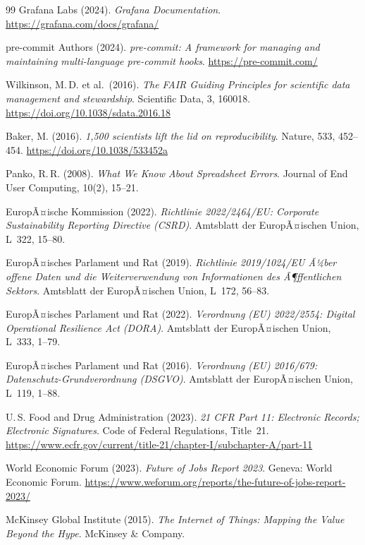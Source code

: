 ﻿\documentclass[12pt,a4paper]{report}
\theoremstyle{definition}
\theoremstyle{remark}
\begin{document}
\begin{thebibliography}{99}
  Grafana Labs (2024).
  \textit{Grafana Documentation}.
  \url{https://grafana.com/docs/grafana/}

  pre-commit Authors (2024).
  \textit{pre-commit: A framework for managing and maintaining multi-language
  pre-commit hooks}.
  \url{https://pre-commit.com/}

  Wilkinson, M.\,D. et al.\ (2016).
  \textit{The FAIR Guiding Principles for scientific data management
  and stewardship}.
  Scientific Data, 3, 160018.
  \url{https://doi.org/10.1038/sdata.2016.18}

  Baker, M. (2016).
  \textit{1,500 scientists lift the lid on reproducibility}.
  Nature, 533, 452--454.
  \url{https://doi.org/10.1038/533452a}

  Panko, R.\,R. (2008).
  \textit{What We Know About Spreadsheet Errors}.
  Journal of End User Computing, 10(2), 15--21.

  EuropÃ¤ische Kommission (2022).
  \textit{Richtlinie 2022/2464/EU: Corporate Sustainability Reporting
  Directive (CSRD)}.
  Amtsblatt der EuropÃ¤ischen Union, L~322, 15--80.

  EuropÃ¤isches Parlament und Rat (2019).
  \textit{Richtlinie 2019/1024/EU Ã¼ber offene Daten und die
  Weiterverwendung von Informationen des Ã¶ffentlichen Sektors}.
  Amtsblatt der EuropÃ¤ischen Union, L~172, 56--83.

  EuropÃ¤isches Parlament und Rat (2022).
  \textit{Verordnung (EU) 2022/2554: Digital Operational Resilience Act
  (DORA)}.
  Amtsblatt der EuropÃ¤ischen Union, L~333, 1--79.

  EuropÃ¤isches Parlament und Rat (2016).
  \textit{Verordnung (EU) 2016/679: Datenschutz-Grundverordnung (DSGVO)}.
  Amtsblatt der EuropÃ¤ischen Union, L~119, 1--88.

  U.\,S. Food and Drug Administration (2023).
  \textit{21 CFR Part 11: Electronic Records; Electronic Signatures}.
  Code of Federal Regulations, Title~21.
  \url{https://www.ecfr.gov/current/title-21/chapter-I/subchapter-A/part-11}

  World Economic Forum (2023).
  \textit{Future of Jobs Report 2023}.
  Geneva: World Economic Forum.
  \url{https://www.weforum.org/reports/the-future-of-jobs-report-2023/}

  McKinsey Global Institute (2015).
  \textit{The Internet of Things: Mapping the Value Beyond the Hype}.
  McKinsey \& Company.


\end{thebibliography}
\end{document}
